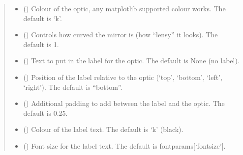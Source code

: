 \documentclass[letterpaper,10pt,english]{sphinxmanual}
\begin{document}
\begin{fulllineitems}
\begin{fulllineitems}
\begin{quote}
\begin{description}
\begin{itemize}
\item {} 
\sphinxAtStartPar
{} (\sphinxstyleliteralemphasis{\sphinxupquote{, }}) \textendash{} Colour of the optic, any matplotlib supported colour works. The default is ‘k’.

\item {} 
\sphinxAtStartPar
{} (\sphinxstyleliteralemphasis{\sphinxupquote{, }}) \textendash{} Controls how curved the mirror is (how “lens\sphinxhyphen{}y” it looks). The default is 1.

\item {} 
\sphinxAtStartPar
{} (\sphinxstyleliteralemphasis{\sphinxupquote{, }}) \textendash{} Text to put in the label for the optic. The default is None (no label).

\item {} 
\sphinxAtStartPar
{} (\sphinxstyleliteralemphasis{\sphinxupquote{, }}) \textendash{} Position of the label relative to the optic (‘top’, ‘bottom’, ‘left’, ‘right’).
The default is “bottom”.

\item {} 
\sphinxAtStartPar
{} (\sphinxstyleliteralemphasis{\sphinxupquote{, }}) \textendash{} Additional padding to add between the label and the optic. The default is 0.25.

\item {} 
\sphinxAtStartPar
{} (\sphinxstyleliteralemphasis{\sphinxupquote{, }}) \textendash{} Colour of the label text. The default is ‘k’ (black).

\item {} 
\sphinxAtStartPar
{} (\sphinxstyleliteralemphasis{\sphinxupquote{, }}) \textendash{} Font size for the label text. The default is fontparams{[}‘fontsize’{]}.


\end{itemize}
\end{description}
\end{quote}
\end{fulllineitems}
\end{fulllineitems}
\end{document}
